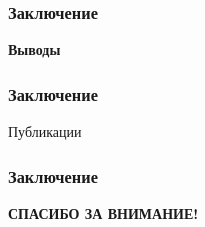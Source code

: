 \documentclass[compress,professionalfont]{beamer}
\begin{document}
\begin{frame}
\frametitle{Заключение}

\begin{center}
\Huge\bf Выводы
\end{center}

\end{frame}

\begin{frame}
\frametitle{Заключение}

Публикации
\begin{center}

\end{center}

\end{frame}

\begin{frame}

\frametitle{Заключение}

\begin{center}
\Large\bf СПАСИБО ЗА ВНИМАНИЕ!
\end{center}

\end{frame}
\end{document}
